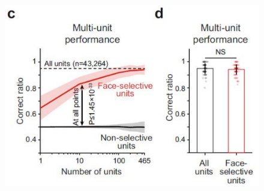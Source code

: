 \documentclass[sn-mathphys]{sn-jnl}%
\theoremstyle{thmstyleone}%
\theoremstyle{thmstyletwo}%
\theoremstyle{thmstylethree}%
\begin{document}
\begin{figure}[htbp]
	\centering
	
	\subfigure%
	{
		\begin{minipage}[t]{1.0\linewidth}
			\centering
			\includegraphics[width=1.0\textwidth]{figs/fig_3_c_d.pdf}
		\end{minipage}%
	}%
	

\end{figure}
\end{document}
